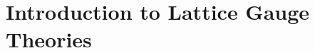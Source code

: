 \chapter{Introduction to Lattice Gauge Theories}
\label{chap:introduction_to_lattice_gauge_theories}






